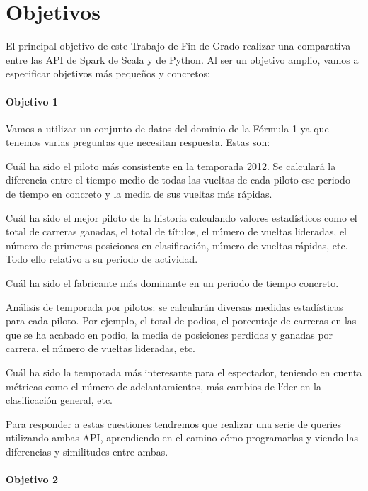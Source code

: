 \documentclass[12pt,twoside,titlepage]{report}
\begin{document}
\chapter{Objetivos}
\newpage

El principal objetivo de este Trabajo de Fin de Grado realizar una comparativa entre las API de Spark de Scala y de Python. Al ser un objetivo amplio, vamos a especificar objetivos más pequeños y concretos:


\subsubsection{Objetivo 1}

Vamos a utilizar un conjunto de datos del dominio de la Fórmula 1 ya que tenemos varias preguntas que necesitan respuesta. Estas son:

\begin{compactitem}
  \item Cuál ha sido el piloto más consistente en la temporada 2012. Se calculará la diferencia entre el tiempo medio de todas las vueltas de cada piloto ese periodo de tiempo en concreto y la media de sus vueltas más rápidas.
  \item Cuál ha sido el mejor piloto de la historia calculando valores estadísticos como el total de carreras ganadas, el total de títulos, el número de vueltas lideradas, el número de primeras posiciones en clasificación, número de vueltas rápidas, etc. Todo ello relativo a su periodo de actividad.
  \item Cuál ha sido el fabricante más dominante en un periodo de tiempo concreto.
  \item Análisis de temporada por pilotos: se calcularán diversas medidas estadísticas para cada piloto. Por ejemplo, el total de podios, el porcentaje de carreras en las que se ha acabado en podio, la media de posiciones perdidas y ganadas por carrera, el número de vueltas lideradas, etc.
  \item Cuál ha sido la temporada más interesante para el espectador, teniendo en cuenta métricas como el número de adelantamientos, más cambios de líder en la clasificación general, etc.
\end{compactitem}

Para responder a estas cuestiones tendremos que realizar una serie de queries utilizando ambas API, aprendiendo en el camino cómo programarlas y viendo las diferencias y similitudes entre ambas.

\subsubsection{Objetivo 2}
\end{document}
